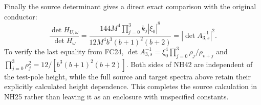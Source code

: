 Finally the source determinant gives a direct exact
comparison with the original conductor:
\[
 \frac{\det H_{U,\omega}}{\det H_\omega}
 =\frac{144M^4\prod_{j=0}^3 k_j|\xi_0|^8}
        {12M^4b^3(b+1)^2(b+2)}
 =|\det A_{3,s}^{-1}|^2.
 \tag{NH42}
\]
To verify the last equality from FC24,
$\det A_{3,s}^{-1}=\xi_0^4\prod_{j=0}^3\rho_j/\rho_{v+j}$
and $\prod_{j=0}^3\rho_j^2=12/[b^3(b+1)^2(b+2)]$.
Both sides of NH42 are independent of the test-pole height,
while the full source and target spectra above retain
their explicitly calculated height dependence. This
completes the source calculation in NH25 rather than
leaving it as an enclosure with unspecified constants.

